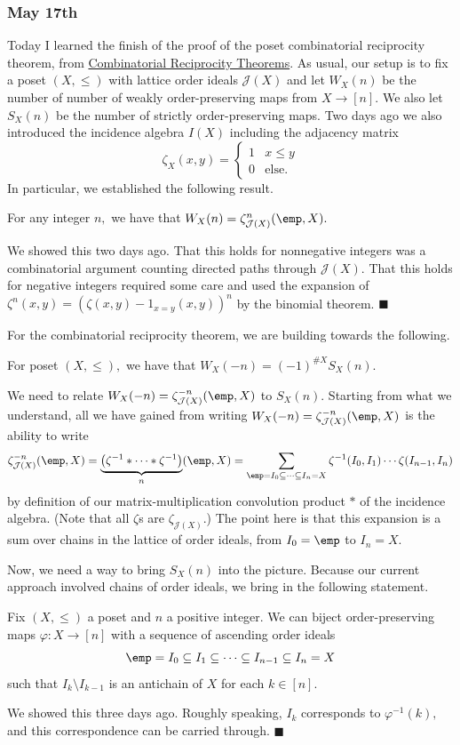 \subsubsection{May 17th}
Today I learned the finish of the proof of the poset combinatorial reciprocity theorem, from \href{https://web.archive.org/web/20201112023302/http://math.sfsu.edu/beck/papers/crt.pdf}{Combinatorial Reciprocity Theorems}. As usual, our setup is to fix a poset $(X,\le)$ with lattice order ideals $\mathcal J(X)$ and let $W_X(n)$ be the number of number of weakly order-preserving maps from $X\to[n].$ We also let $S_X(n)$ be the number of strictly order-preserving maps. Two days ago we also introduced the incidence algebra $I(X)$ including the adjacency matrix
\[\zeta_X(x,y)=\begin{cases}
    1 & x \le y \\
    0 & \text{else}.
\end{cases}\]
In particular, we established the following result.
\begin{proposition}
    For any integer $n,$ we have that $W_X(n)=\zeta_{\mathcal J(X)}^n(\emp,X).$
\end{proposition}
We showed this two days ago. That this holds for nonnegative integers was a combinatorial argument counting directed paths through $\mathcal J(X).$ That this holds for negative integers required some care and used the expansion of $\zeta^n(x,y)=(\zeta(x,y)-1_{x=y}(x,y))^n$ by the binomial theorem. $\blacksquare$

For the combinatorial reciprocity theorem, we are building towards the following.
\begin{theorem}
    For poset $(X,\le),$ we have that $W_X(-n)=(-1)^{\#X}S_X(n).$
\end{theorem}
We need to relate $W_X(-n)=\zeta_{\mathcal J(X)}^{-n}(\emp,X)$ to $S_X(n).$ Starting from what we understand, all we have gained from writing $W_X(-n)=\zeta_{\mathcal J(X)}^{-n}(\emp,X)$ is the ability to write
\[\zeta_{\mathcal J(X)}^{-n}(\emp,X)=\underbrace{\left(\zeta^{-1}*\cdots*\zeta^{-1}\right)}_n(\emp,X)=\sum_{\emp=I_0\subseteq\cdots\subseteq I_n=X}\zeta^{-1}(I_0,I_1)\cdots\zeta(I_{n-1},I_n)\]
by definition of our matrix-multiplication convolution product $*$ of the incidence algebra. (Note that all $\zeta$s are $\zeta_{\mathcal J(X)}.$) The point here is that this expansion is a sum over chains in the lattice of order ideals, from $I_0=\emp$ to $I_n=X.$

Now, we need a way to bring $S_X(n)$ into the picture. Because our current approach involved chains of order ideals, we bring in the following statement.
\begin{proposition}
    Fix $(X,\le)$ a poset and $n$ a positive integer. We can biject order-preserving maps $\varphi:X\to[n]$ with a sequence of ascending order ideals
    \[\emp=I_0\subseteq I_1\subseteq\cdots\subseteq I_{n-1}\subseteq I_n=X\]
    such that $I_k\setminus I_{k-1}$ is an antichain of $X$ for each $k\in[n].$
\end{proposition}
We showed this three days ago. Roughly speaking, $I_k$ corresponds to $\varphi^{-1}(k),$ and this correspondence can be carried through. $\blacksquare$

